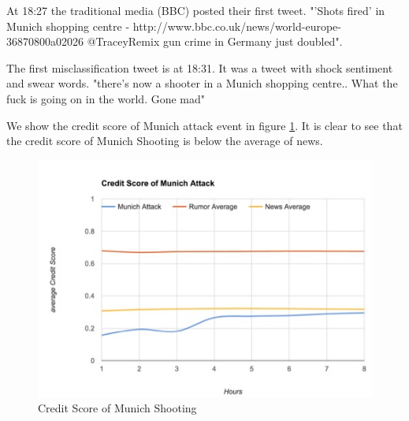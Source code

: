 At 18:27 the traditional media (BBC) posted their first tweet. "'Shots fired' in Munich shopping centre - http://www.bbc.co.uk/news/world-europe-36870800a02026 @TraceyRemix gun crime in Germany just doubled".

The first misclassification tweet is at 18:31. It was a tweet with shock sentiment and swear words. "there's now a shooter in a Munich shopping centre.. What the fuck is going on in the world. Gone mad"

We show the credit score of Munich attack event in figure \ref{fig:munichattackCS}. It is clear to see that the credit score of Munich Shooting is below the average of news.  
  \begin{figure}[!h]
\centering
\includegraphics[width=0.7\columnwidth]{images/munichCD.png}
\caption{Credit Score of Munich Shooting}
\label{fig:munichattackCS}
\end{figure}

